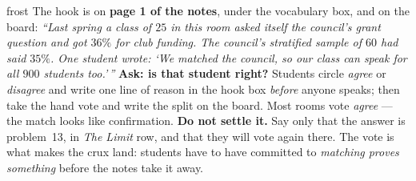 \documentclass[10pt]{article}
\begin{document}
\boxguard
\begin{skillbox}{frost}
The hook is on \textbf{page 1 of the notes}, under the vocabulary box, and on the board:
\textit{``Last spring a class of $25$ in this room asked itself the council's grant question and
got $36\%$ for club funding. The council's stratified sample of $60$ had said $35\%$. One student
wrote: `We matched the council, so our class can speak for all $900$ students too.'\,''}
\textbf{Ask: is that student right?} Students circle \emph{agree} or \emph{disagree} and write one
line of reason in the hook box \emph{before} anyone speaks; then take the hand vote and write the
split on the board. Most rooms vote \emph{agree} --- the match looks like confirmation.
\textbf{Do not settle it.} Say only that the answer is problem~13, in \emph{The Limit} row, and
that they will vote again there. The vote is what makes the crux land: students have to have
committed to \emph{matching proves something} before the notes take it away.
\end{skillbox}
\end{document}
